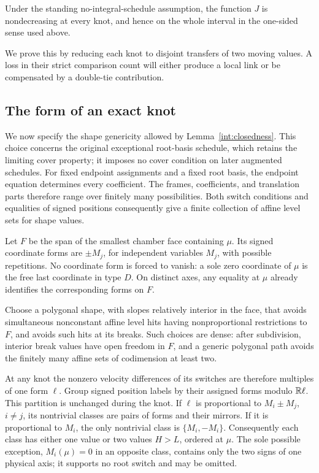 \begin{proposition}\label{prop:knot-count}
Under the standing no-integral-schedule assumption, the function
\(J\) is nondecreasing at every knot, and hence on the whole interval
in the one-sided sense used above.
\end{proposition}

We prove this by reducing each knot to disjoint transfers of two
moving values.  A loss in their strict comparison count will either
produce a local link or be compensated by a double-tie contribution.

\subsection{The form of an exact knot}

We now specify the shape genericity allowed by
Lemma~\ref{int:closedness}.  This choice concerns the original
exceptional root-basis schedule, which retains the limiting cover
property; it imposes no cover condition on later augmented schedules.
For fixed endpoint assignments and a fixed root basis, the endpoint
equation determines every coefficient.  The frames, coefficients,
and translation parts therefore range over finitely many possibilities.
Both switch conditions and equalities of signed positions consequently
give a finite collection of affine level sets for shape values.

Let \(F\) be the span of the smallest chamber face containing \(\mu\).
Its signed coordinate forms are \(\pm M_j\), for independent
variables \(M_j\), with possible repetitions.  No coordinate form
is forced to vanish: a sole zero coordinate of \(\mu\) is the free
last coordinate in type \(D\).  On distinct axes, any equality at
\(\mu\) already identifies the corresponding forms on \(F\).

Choose a polygonal shape, with slopes relatively interior in the face,
that avoids simultaneous nonconstant affine level hits having
nonproportional restrictions to \(F\), and avoids such hits at its
breaks.  Such choices are dense: after subdivision, interior break
values have open freedom in \(F\), and a generic polygonal path
avoids the finitely many affine sets of codimension at least two.

At any knot the nonzero velocity differences of its switches are
therefore multiples of one form \(\ell\).  Group signed position labels
by their assigned forms modulo \(\mathbb R\ell\).  This partition is unchanged
during the knot.  If \(\ell\) is proportional to \(M_i\pm M_j\),
\(i\ne j\), its nontrivial classes are pairs of forms and their
mirrors.  If it is proportional to \(M_i\), the only nontrivial class
is \(\{M_i,-M_i\}\).  Consequently each class has either one value or
two values \(H>L\), ordered at \(\mu\).  The sole possible exception,
\(M_i(\mu)=0\) in an opposite class, contains only the two signs of
one physical axis; it supports no root switch and may be omitted.

